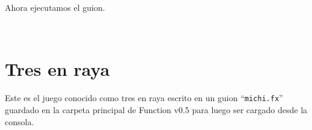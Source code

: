 \begin{fxcode}
         \\
         \\
         \\
         \\
         \\
         \\
         \\
         \\
         \\
         \\
      \end{fxcode}
   
      Ahora ejecutamos el guion.
      
      \begin{fxcode}
         \\
      \end{fxcode}
      
   \section{Tres en raya}
      Este es el juego conocido como tres en raya escrito en un guion ``\texttt{michi.fx}'' guardado en la carpeta principal de Function v0.5 para luego ser cargado desde la consola.
      
